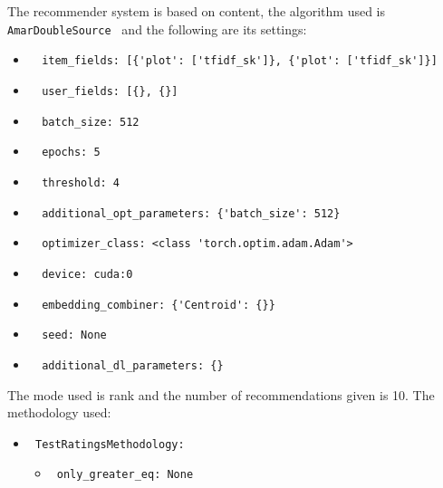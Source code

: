 \documentclass[11pt]{article}
\begin{document}
The recommender system is based on content, the algorithm used
is \verb| AmarDoubleSource | and the following are its settings:
\begin{itemize}
  \item \begin{verbatim}
  item_fields: [{'plot': ['tfidf_sk']}, {'plot': ['tfidf_sk']}]
\end{verbatim}
 \item \begin{verbatim}
  user_fields: [{}, {}]
\end{verbatim}
 \item \begin{verbatim}
  batch_size: 512
\end{verbatim}
 \item \begin{verbatim}
  epochs: 5
\end{verbatim}
 \item \begin{verbatim}
  threshold: 4
\end{verbatim}
 \item \begin{verbatim}
  additional_opt_parameters: {'batch_size': 512}
\end{verbatim}
  \item \begin{verbatim}
  optimizer_class: <class 'torch.optim.adam.Adam'>
\end{verbatim}
 \item \begin{verbatim}
  device: cuda:0
\end{verbatim}
 \item \begin{verbatim}
  embedding_combiner: {'Centroid': {}}
\end{verbatim}
 \item \begin{verbatim}
  seed: None
\end{verbatim}
 \item \begin{verbatim}
  additional_dl_parameters: {}
\end{verbatim}
\end{itemize}
\hfill\break
The mode used is rank and the number of recommendations given
is 10.
The methodology used:
\begin{itemize}
    \item \verb| TestRatingsMethodology:|
    \begin{itemize}
                    \item \verb| only_greater_eq: None |
            \end{itemize}
\end{itemize}
\hfill\break
\end{document}
